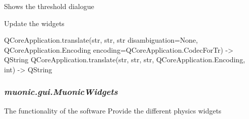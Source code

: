\documentclass[letterpaper,10pt,english]{sphinxmanual}
\begin{document}
\begin{fulllineitems}
\begin{fulllineitems}
\end{fulllineitems}


\begin{fulllineitems}
\label{muonic:muonic.gui.MainWindow.MainWindow.threshold_menu}
Shows the threshold dialogue

\end{fulllineitems}


\begin{fulllineitems}
\label{muonic:muonic.gui.MainWindow.MainWindow.widgetUpdate}
Update the widgets

\end{fulllineitems}


\end{fulllineitems}


\begin{fulllineitems}
\label{muonic:muonic.gui.MainWindow.tr}
QCoreApplication.translate(str, str, str disambiguation=None, QCoreApplication.Encoding encoding=QCoreApplication.CodecForTr) -\textgreater{} QString
QCoreApplication.translate(str, str, str, QCoreApplication.Encoding, int) -\textgreater{} QString

\end{fulllineitems}



\subsubsection{\emph{muonic.gui.MuonicWidgets}}
\label{muonic:muonic-gui-muonicwidgets}
The functionality of the software
\label{muonic:module-muonic.gui.MuonicWidgets}
Provide the different physics widgets
\end{document}
